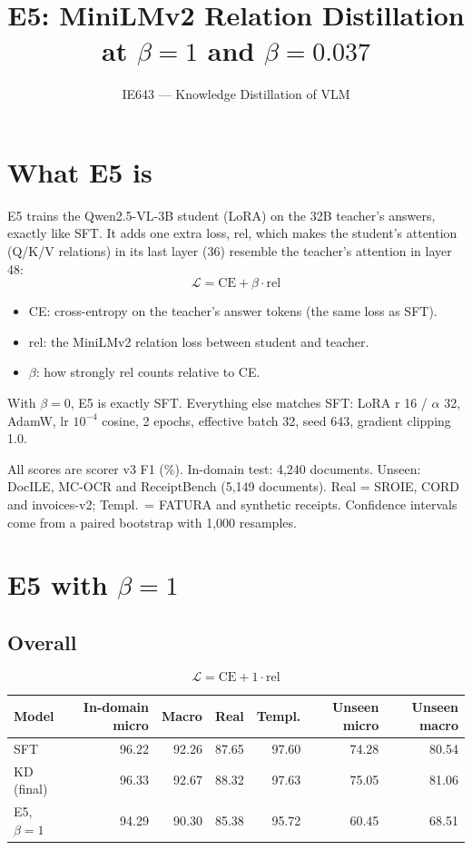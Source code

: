 \documentclass[10pt]{article}
\title{E5: MiniLMv2 Relation Distillation at $\beta = 1$ and $\beta = 0.037$}
\author{IE643 --- Knowledge Distillation of VLM}
\date{}
\newcommand{\lossone}{\[ \mathcal{L} = \mathrm{CE} + 1 \cdot \mathrm{rel} \]}
\begin{document}
\maketitle
\vspace{-1.5em}

\section*{What E5 is}

E5 trains the Qwen2.5-VL-3B student (LoRA) on the 32B teacher's answers, exactly like SFT. It adds one extra loss, rel, which makes the student's attention (Q/K/V relations) in its last layer (36) resemble the teacher's attention in layer 48:
\[
  \mathcal{L} = \mathrm{CE} + \beta \cdot \mathrm{rel}
\]
\begin{itemize}
  \item CE: cross-entropy on the teacher's answer tokens (the same loss as SFT).
  \item rel: the MiniLMv2 relation loss between student and teacher.
  \item $\beta$: how strongly rel counts relative to CE.
\end{itemize}
With $\beta = 0$, E5 is exactly SFT. Everything else matches SFT: LoRA r 16 / $\alpha$ 32, AdamW, lr $10^{-4}$ cosine, 2 epochs, effective batch 32, seed 643, gradient clipping 1.0.

All scores are scorer v3 F1 (\%). In-domain test: 4{,}240 documents. Unseen: DocILE, MC-OCR and ReceiptBench (5{,}149 documents). Real = SROIE, CORD and invoices-v2; Templ.\ = FATURA and synthetic receipts. Confidence intervals come from a paired bootstrap with 1{,}000 resamples.

\section{E5 with $\beta = 1$}

\subsection*{Overall}
\lossone
\begin{center}
\begin{tabular}{lrrrrrr}
\toprule
Model & In-domain micro & Macro & Real & Templ. & Unseen micro & Unseen macro \\
\midrule
SFT & 96.22 & 92.26 & 87.65 & 97.60 & 74.28 & 80.54 \\
KD (final) & 96.33 & 92.67 & 88.32 & 97.63 & 75.05 & 81.06 \\
E5, $\beta = 1$ & 94.29 & 90.30 & 85.38 & 95.72 & 60.45 & 68.51 \\
\bottomrule
\end{tabular}
\end{center}
\end{document}
